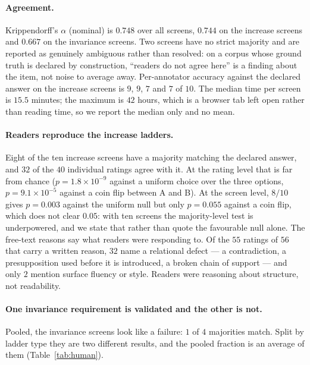 \paragraph{Agreement.} Krippendorff's $\alpha$ (nominal) is $0.748$ over all screens, $0.744$ on the
increase screens and $0.667$ on the invariance screens. Two screens have no strict majority and are
reported as genuinely ambiguous rather than resolved: on a corpus whose ground truth is declared by
construction, ``readers do not agree here'' is a finding about the item, not noise to average away.
Per-annotator accuracy against the declared answer on the increase screens is $9$, $9$, $7$ and $7$ of
$10$. The median time per screen is $15.5$ minutes; the maximum is $42$ hours, which is a browser tab
left open rather than reading time, so we report the median only and no mean.

\paragraph{Readers reproduce the increase ladders.} Eight of the ten increase screens have a majority
matching the declared answer, and $32$ of the $40$ individual ratings agree with it. At the rating
level that is far from chance ($p=1.8\times10^{-9}$ against a uniform choice over the three options,
$p=9.1\times10^{-5}$ against a coin flip between A and B). At the screen level, $8/10$ gives
$p=0.003$ against the uniform null but only $p=0.055$ against a coin flip, which does not clear
$0.05$: with ten screens the majority-level test is underpowered, and we state that rather than quote
the favourable null alone. The free-text reasons say what readers were responding to. Of the $55$
ratings of $56$ that carry a written reason, $32$ name a relational defect --- a contradiction, a presupposition used
before it is introduced, a broken chain of support --- and only $2$ mention surface fluency or style.
Readers were reasoning about structure, not readability.

\paragraph{One invariance requirement is validated and the other is not.} Pooled, the invariance
screens look like a failure: $1$ of $4$ majorities match. Split by ladder type they are two different
results, and the pooled fraction is an average of them (Table~\ref{tab:human}).

